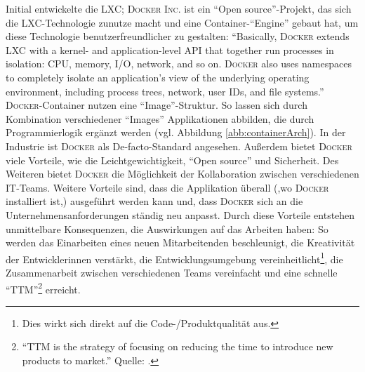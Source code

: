 Initial entwickelte \cite{canonical_ltd_linux_2020} die \ac{LXC}; \textsc{Docker Inc.} ist ein \enquote{Open source}-Projekt, das sich die \ac{LXC}-Technologie zunutze macht und eine Container-\enquote{Engine} gebaut hat, um diese Technologie benutzerfreundlicher zu gestalten: \enquote{Basically, \textsc{Docker} extends LXC with a kernel- and application-level API that together run processes in isolation: CPU, memory, I/O, network, and so on. \textsc{Docker} also uses namespaces to completely isolate an application’s view of the underlying operating environment, including process trees, network, user IDs, and file systems.}\autocite[][S.\,82]{bernstein_containers_2014} \textsc{Docker}-Container nutzen eine \enquote{Image}-Struktur. So lassen sich durch Kombination verschiedener \enquote{Images} Applikationen abbilden, die durch Programmierlogik ergänzt werden (vgl. Abbildung \vref{abb:containerArch}). In der Industrie ist \textsc{Docker} als De-facto-Standard\autocite[vgl.][S.\,30]{pahl_containerization_2015} angesehen\autocite[vgl.][S.\,1]{kharb_automated_2016}. Außerdem bietet \textsc{Docker} viele Vorteile, wie die Leichtgewichtigkeit, \enquote{Open source} und Sicherheit. Des Weiteren bietet \textsc{Docker} die Möglichkeit der Kollaboration zwischen verschiedenen IT-Teams. Weitere Vorteile sind, dass die Applikation überall (,wo \textsc{Docker} installiert ist,) ausgeführt werden kann und, dass \textsc{Docker} sich an die Unternehmensanforderungen ständig neu anpasst.\autocite[vgl.][S.\,1]{kharb_automated_2016} Durch diese Vorteile entstehen unmittelbare Konsequenzen, die Auswirkungen auf das Arbeiten haben: So werden das Einarbeiten eines neuen Mitarbeitenden beschleunigt, die Kreativität der Entwicklerinnen verstärkt, die Entwicklungsumgebung vereinheitlicht\footnote{Dies wirkt sich direkt auf die Code-/Produktqualität aus.}, die Zusammenarbeit zwischen verschiedenen Teams vereinfacht und eine schnelle \enquote{\ac{TTM}}\footnote{\enquote{TTM is the strategy of focusing on reducing the time to introduce new products to market.} Quelle: \cite[][S.\,14]{pawar_time_1994}.} erreicht.\autocite[vgl.][S.\,2]{kharb_automated_2016} 
\par 
